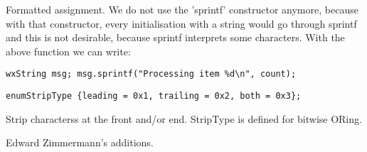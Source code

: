 \label{wxstringsprintf}

Formatted assignment. We do not use the 'sprintf' constructor anymore,
because with that constructor, every initialisation with a string would
go through sprintf and this is not desirable, because sprintf
interprets some characters. With the above function we can write:

\begin{verbatim}
wxString msg; msg.sprintf("Processing item %d\n", count);
\end{verbatim}

\label{wxstringStrip}

\begin{verbatim}
enumStripType {leading = 0x1, trailing = 0x2, both = 0x3};
\end{verbatim}


Strip characterss at the front and/or end.
StripType is defined for bitwise ORing.

\label{wxstringSubString}


Edward Zimmermann's additions.

\label{wxstringThrough}

\\
\\
\\
\\
\\

\label{wxstringUpcase}

\\

\label{wxstringUpperCase}

